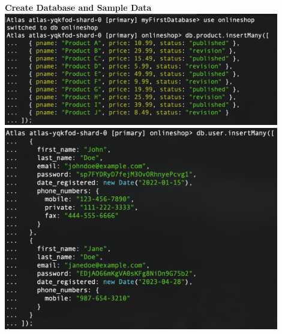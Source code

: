 \documentclass[14pt,a4paper]{extarticle}
\begin{document}
	\noindent \textbf{Create Database and Sample Data} \\
	\includegraphics[width=0.9\textwidth]{images/sc07.png} \\
	\includegraphics[width=0.9\textwidth]{images/sc08.png} 




	

\end{document}
